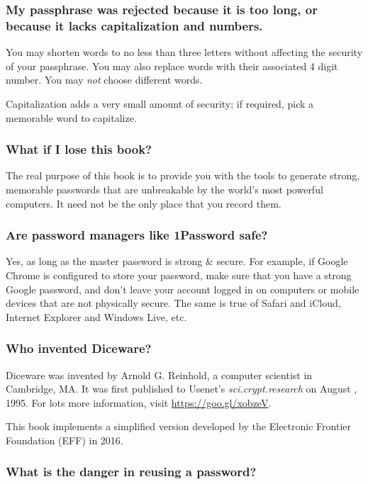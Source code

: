 \subsubsection{My passphrase was rejected because it is too long, or because it lacks capitalization and numbers.}

You may shorten words to no less than three letters without affecting the security of your passphrase. You may also replace words with their associated 4 digit number. You may \textit{not} choose different words.

Capitalization adds a very small amount of security; if required, pick a memorable word to capitalize.

\subsubsection{What if I lose this book?}

The real purpose of this book is to provide you with the tools to generate strong, memorable passwords that are unbreakable by the world's most powerful computers. It need not be the only place that you record them.

\subsubsection{Are password managers like 1Password safe?}

Yes, as long as the master password is strong \& secure. For example, if Google Chrome is configured to store your password, make sure that you have a strong Google password, and don't leave your account logged in on computers or mobile devices that are not physically secure. The same is true of Safari and iCloud, Internet Explorer and Windows Live, etc.

\subsubsection{Who invented Diceware?}

Diceware was invented by Arnold G. Reinhold, a computer scientist in Cambridge, MA. It was first published to Usenet's \textit{sci.crypt.research} on August , 1995. For lots more information, visit 
\url{https://goo.gl/xobzeV}.

This book implements a simplified version developed by the Electronic Frontier Foundation (EFF) in 2016.
 
\subsubsection{What is the danger in reusing a password?}

